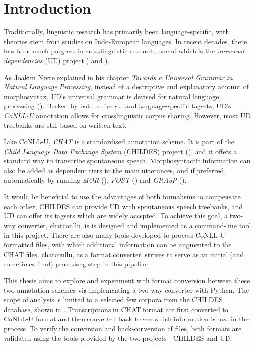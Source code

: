 \chapter{Introduction} %

\label{Chapter1} %

Traditionally, linguistic research has primarily been language-specific, with theories stem from studies on Indo-European languages. In recent decades, there has been much progress in crosslinguistic research, one of which is the \emph{universal dependencies} (UD) project (\cite{nivre2016} and \cite{nivre2020}).

As Joakim Nivre explained in his chapter \emph{Towards a Universal Grammar in Natural Language Processing}, instead of a descriptive and explanatory account of morphosyntax, UD's universal grammar is devised for natural language processing (\cite{nivre2015}). Backed by both universal and language-specific tagsets, UD's \emph{CoNLL-U} annotation allows for crosslinguistic corpus sharing. However, most UD treebanks are still based on written text.

Like CoNLL-U, \emph{CHAT} is a standardised annotation scheme. It is part of the \emph{Child Language Data Exchange System} (CHILDES) project (\cite{Macwhinney2000}), and it offers a standard way to transcribe spontaneous speech. Morphosyntactic information can also be added as dependent tiers to the main utterances, and if preferred, automatically by running \emph{MOR} (\cite{Macwhinney2000}), \emph{POST} (\cite{parisse2000}) and \emph{GRASP} (\cite{Sagae2004}).

It would be beneficial to use the advantages of both formalisms to compensate each other, CHILDES can provide UD with spontaneous speech treebanks, and UD can offer its tagsets which are widely accepted. To achieve this goal, a two-way converter, chatconllu, is is designed and implemented as a command-line tool in this project. There are also many tools developed to process CoNLL-U formatted files, with which additional information can be augmented to the CHAT files. chatconllu, as a format converter, strives to serve as an initial (and sometimes final) procesisng step in this pipeline.

This thesis aims to explore and experiment with format conversion between these two annotation schemes via implementing a two-way converter with Python. The scope of analysis is limited to a selected few corpora from the CHILDES database, shown in . Transcriptions in CHAT format are first converted to CoNLL-U format and then converted back to see which information is lost in the process. To verify the conversion and back-conversion of files, both formats are validated using the tools provided by the two projects---CHILDES and UD.

